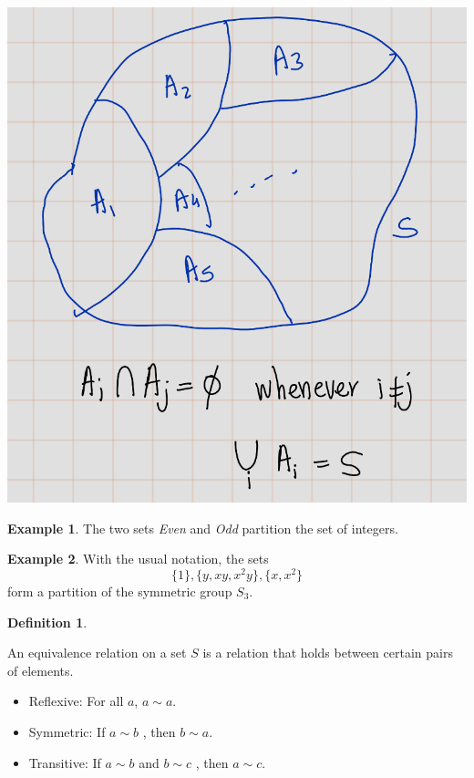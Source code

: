 \documentclass[
]{book}
\providecommand{\tightlist}{%
  \setlength{\itemsep}{0pt}\setlength{\parskip}{0pt}}
\theoremstyle{definition}
\newtheorem{definition}{Definition}[chapter]
\theoremstyle{definition}
\newtheorem{example}{Example}[chapter]
\theoremstyle{definition}
\theoremstyle{definition}
\theoremstyle{remark}
\begin{document}
\includegraphics{figures/ch_2/fig32.png}

\begin{example}
\protect\hypertarget{exm:unnamed-chunk-21}{}\label{exm:unnamed-chunk-21}The two sets \emph{Even} and \emph{Odd} partition the set of integers.
\end{example}

\begin{example}
\protect\hypertarget{exm:unnamed-chunk-22}{}\label{exm:unnamed-chunk-22}With the usual notation, the sets
\[\{1\}, \{y, xy, x^2y\}, \{x, x^2\}\]
form a partition of the symmetric group \(S_3\).
\end{example}

\begin{definition}
\protect\hypertarget{def:unnamed-chunk-23}{}\label{def:unnamed-chunk-23}

An equivalence relation on a set \(S\) is a relation that holds between certain pairs of elements.

\begin{itemize}
\tightlist
\item
  Reflexive: For all \(a\), \(a \sim a\).
\item
  Symmetric: If \(a \sim b\) , then \(b \sim a\).
\item
  Transitive: If \(a \sim b\) and \(b \sim c\) , then \(a \sim c\).
\end{itemize}

\end{definition}
\end{document}
